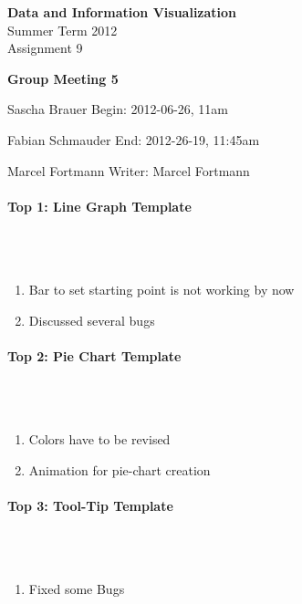 \documentclass{scrartcl}
\begin{document}
\begin{center}
{\huge \textbf{Data and Information Visualization}}\\
Summer Term 2012\\
Assignment 9
\end{center}

\begin{center}
{\huge \textbf{Group Meeting 5}}\\
\end{center}
\begin{description}
\item Sascha Brauer \hfill Begin: 2012-06-26, 11am 
\item Fabian Schmauder \hfill End: 2012-26-19, 11:45am
\item Marcel Fortmann \hfill Writer: Marcel Fortmann
\end{description}

\paragraph{Top 1: Line Graph Template}
\hfill \\ \hfill \\
\begin {enumerate}
\item Bar to set starting point is not working by now
\item Discussed several bugs
\end {enumerate}

\paragraph{Top 2: Pie Chart Template}
\hfill \\ \hfill \\
\begin {enumerate}
\item Colors have to be revised
\item Animation for pie-chart creation
\end {enumerate}

\paragraph{Top 3: Tool-Tip Template}
\hfill \\ \hfill \\
\begin {enumerate}
\item Fixed some Bugs
\end {enumerate}
\end{document}
